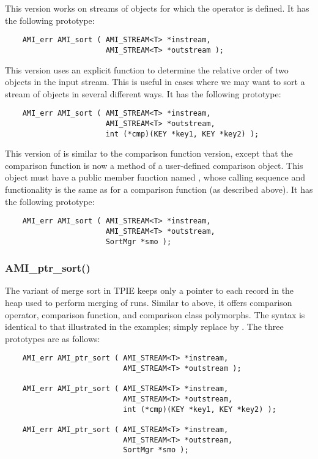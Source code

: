   This version works on streams of
objects for which the operator \myverb{<} is defined.  It
has the following prototype:

\begin{verbatim}
    AMI_err AMI_sort ( AMI_STREAM<T> *instream, 
                       AMI_STREAM<T> *outstream );
\end{verbatim}


This version uses an explicit function to determine the
relative order of two objects in the input stream.  This is
useful in cases where we may want to sort a stream of
objects in several different ways.  It has the following
prototype:

\begin{verbatim}
    AMI_err AMI_sort ( AMI_STREAM<T> *instream, 
                       AMI_STREAM<T> *outstream, 
                       int (*cmp)(KEY *key1, KEY *key2) );
\end{verbatim}


This version of  is similar to the
comparison function version, except that the comparison
function is now a method of a user-defined comparison
object. This object must have a public member function named
, whose calling sequence and functionality
is the same as for a comparison function (as described
above). It has the following prototype:

\begin{verbatim}
    AMI_err AMI_sort ( AMI_STREAM<T> *instream, 
                       AMI_STREAM<T> *outstream, 
                       SortMgr *smo );
\end{verbatim}

\subsubsection{AMI\_ptr\_sort()}

The  variant of merge sort in TPIE
keeps only a pointer to each record in the heap used to
perform merging of runs. Similar to 
above, it offers comparison operator, comparison function,
and comparison class polymorphs. The syntax is identical to
that illustrated in the  examples; simply
replace  by . The
three prototypes are as follows:

\begin{verbatim}
    AMI_err AMI_ptr_sort ( AMI_STREAM<T> *instream, 
                           AMI_STREAM<T> *outstream );

    AMI_err AMI_ptr_sort ( AMI_STREAM<T> *instream, 
                           AMI_STREAM<T> *outstream, 
                           int (*cmp)(KEY *key1, KEY *key2) );

    AMI_err AMI_ptr_sort ( AMI_STREAM<T> *instream, 
                           AMI_STREAM<T> *outstream, 
                           SortMgr *smo );
\end{verbatim}


